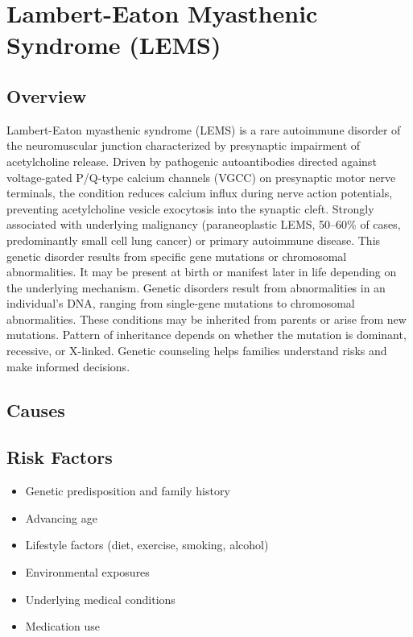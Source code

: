 \chapter{Lambert-Eaton Myasthenic Syndrome (LEMS)}
\label{sec:Lambert-Eaton Myasthenic Syndrome (LEMS)}

\section{Overview}
Lambert-Eaton myasthenic syndrome (LEMS) is a rare autoimmune disorder of the neuromuscular junction characterized by presynaptic impairment of acetylcholine release. Driven by pathogenic autoantibodies directed against voltage-gated P/Q-type calcium channels (VGCC) on presynaptic motor nerve terminals, the condition reduces calcium influx during nerve action potentials, preventing acetylcholine vesicle exocytosis into the synaptic cleft. Strongly associated with underlying malignancy (paraneoplastic LEMS, 50--60\% of cases, predominantly small cell lung cancer) or primary autoimmune disease. This genetic disorder results from specific gene mutations or chromosomal abnormalities. It may be present at birth or manifest later in life depending on the underlying mechanism. Genetic disorders result from abnormalities in an individual's DNA, ranging from single-gene mutations to chromosomal abnormalities. These conditions may be inherited from parents or arise from new mutations. Pattern of inheritance depends on whether the mutation is dominant, recessive, or X-linked. Genetic counseling helps families understand risks and make informed decisions.
\section{Causes}
\section{Risk Factors}

\begin{itemize}[noitemsep]
  \item Genetic predisposition and family history
  \item Advancing age
  \item Lifestyle factors (diet, exercise, smoking, alcohol)
  \item Environmental exposures
  \item Underlying medical conditions
  \item Medication use
\end{itemize}

